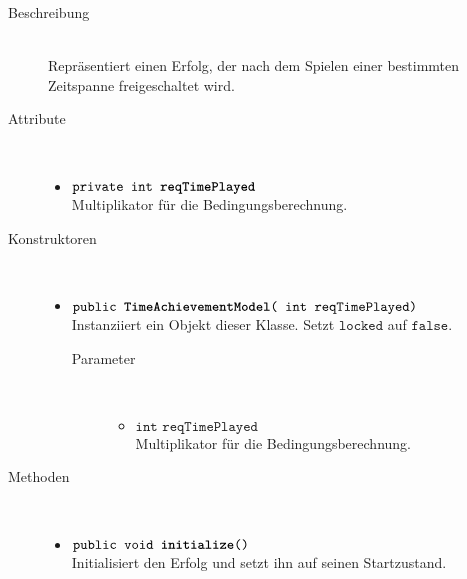 \begin{description}

\item[Beschreibung] \hfill \\ Repräsentiert einen Erfolg, der nach dem Spielen einer bestimmten Zeitspanne freigeschaltet wird.

\item[Attribute] \hfill \\
	\vspace{-.8cm}
	\begin{itemize}
		\item $\texttt{private int \textbf{reqTimePlayed}}$ \\ Multiplikator für die Bedingungsberechnung.
	\end{itemize}
	
\item[Konstruktoren] \hfill \\
	\vspace{-.8cm}
	\begin{itemize}
		\item $\texttt{public \textbf{TimeAchievementModel}( int reqTimePlayed)}$ \\ Instanziiert ein Objekt dieser Klasse. Setzt $\texttt{locked}$ auf $\texttt{false}$.
		\begin{description}
			\item[Parameter] \hfill \\
			\vspace{-.8cm}
			\begin{itemize}
				\item $\texttt{int reqTimePlayed}$ \\ Multiplikator für die Bedingungsberechnung.
			\end{itemize}
		\end{description}
		
	\end{itemize}
	
\item[Methoden] \hfill \\
	\vspace{-.8cm}
	\begin{itemize}
		\item $\texttt{public void \textbf{initialize}()}$ \\ Initialisiert den Erfolg und setzt ihn auf seinen Startzustand.
		

\end{itemize}
\end{description}
